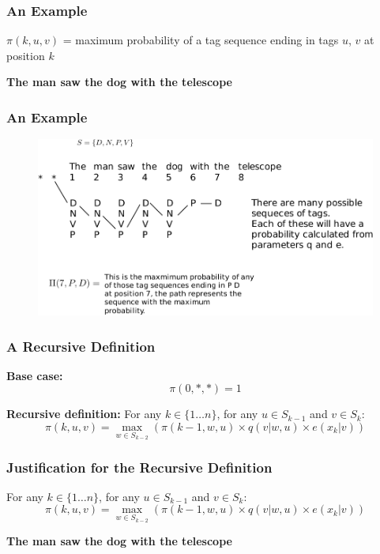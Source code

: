 \documentclass[handout]{beamer}
\begin{document}
\begin{frame}
  \frametitle{An Example}
  $\pi(k, u, v)$ = maximum probability of a tag sequence ending in tags $u$, $v$ at position $k$

  \textbf{The man saw the dog with the telescope}




\end{frame}


\begin{frame}
  \frametitle{An Example}

  \begin{figure}[h]
        	\includegraphics[scale = 0.7]{pics/viterbi1.pdf}
        \end{figure}



\end{frame}

\begin{frame}
  \frametitle{A Recursive Definition}
  \textbf{Base case:}
  \[
    \pi(0, *, *) = 1
  \]

  \textbf{Recursive definition:}
  For any $k \in \{1 \ldots n\}$, for any $u \in S_{k-1}$ and $v \in S_k$:
  \[
    \pi(k, u, v) = \max_{w \in S_{k-2}} (\pi(k - 1, w, u) \times q(v|w, u) \times e(x_k|v))
  \]
\end{frame}

\begin{frame}
  \frametitle{Justification for the Recursive Definition}
  For any $k \in \{1 \ldots n\}$, for any $u \in S_{k-1}$ and $v \in S_k$:
  \[
    \pi(k, u, v) = \max_{w \in S_{k-2}} (\pi(k - 1, w, u) \times q(v|w, u) \times e(x_k|v))
  \]

  \textbf{The man saw the dog with the telescope}
\end{frame}
\end{document}
